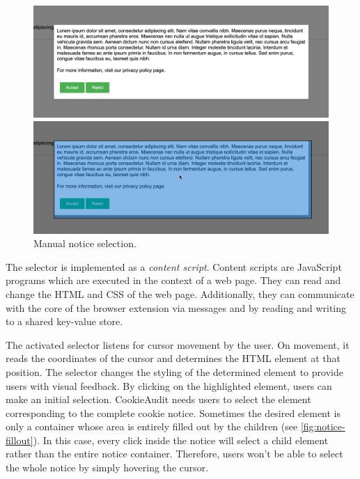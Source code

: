 \begin{figure}
	\centering
	\begin{minipage}{0.48\textwidth}
		\centering
		\includegraphics[width=1.0\linewidth]{media/screenshot_unselected.png}
	\end{minipage}\hfill
	\begin{minipage}{0.48\textwidth}
		\centering
		\includegraphics[width=1.0\linewidth]{media/screenshot_selected.png}      
	\end{minipage}
	\caption{Manual notice selection.}
	\label{fig:screenshot-selection}
\end{figure}

The selector is implemented as a \emph{content script}. Content scripts are JavaScript programs which are executed in the context of a web page. 
They can read and change the HTML and CSS of the web page. 
Additionally, they can communicate with the core of the browser extension via messages and by reading and writing to a shared key-value store.

The activated selector listens for cursor movement by the user. 
On movement, it reads the coordinates of the cursor and determines the HTML element at that position.
The selector changes the styling of the determined element to provide users with visual feedback.
By clicking on the highlighted element, users can make an initial selection.
CookieAudit needs users to select the element corresponding to the complete cookie notice. 
Sometimes the desired element is only a container whose area is entirely filled out by the children (see \cref{fig:notice-fillout}).
In this case, every click inside the notice will select a child element rather than the entire notice container. 
Therefore, users won't be able to select the whole notice by simply hovering the cursor.

